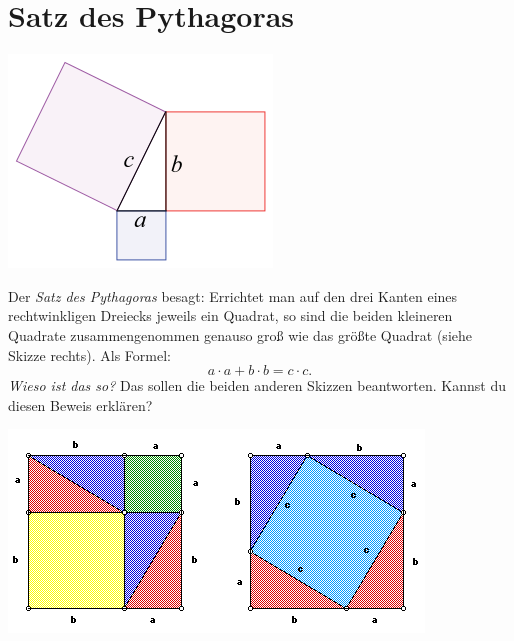 \documentclass{../../zirkelblatt}
\begin{document}
\section*{Satz des Pythagoras}
\begin{floatingfigure}[r]{4cm}
  \vspace{-1cm}
  \includegraphics[scale=0.5]{pythagoras-1}
\end{floatingfigure}
Der \emph{Satz des Pythagoras} besagt: Errichtet man auf den drei Kanten eines
rechtwinkligen Dreiecks jeweils ein Quadrat, so sind die beiden kleineren
Quadrate zusammengenommen genauso groß wie das größte Quadrat (siehe Skizze
rechts). Als Formel:
\[ a \cdot a + b \cdot b = c \cdot c. \]
\emph{Wieso ist das so?} Das sollen die beiden anderen Skizzen beantworten.
Kannst du diesen Beweis erklären?
\begin{center}
\includegraphics{pythagoras-2}
\end{center}

\vfill
\end{document}
